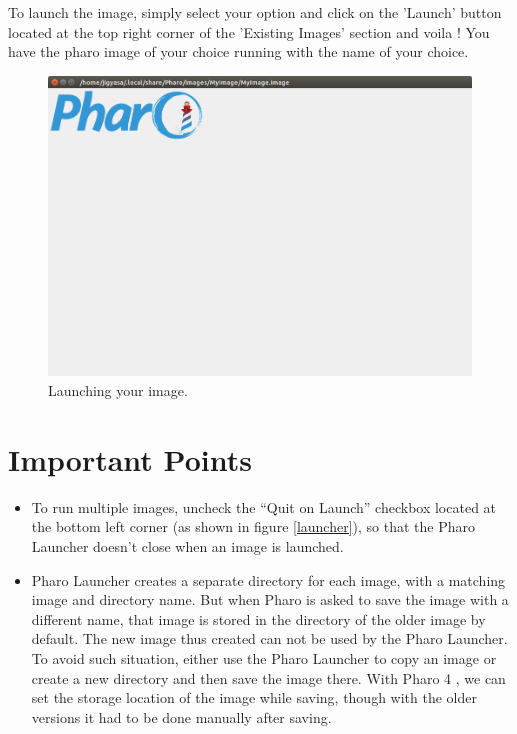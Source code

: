 \documentclass[a4paper,10pt,twoside]{book}
\begin{document}
To launch the image, simply select your option and click on the 'Launch' button located at the top right corner of the 'Existing Images' section and voila ! You have the pharo image of your choice running with the name of your choice.


\begin{figure}

\begin{center}
\includegraphics[width=1.0\textwidth]{figures/myimg.png}\caption{Launching your image.\label{launchPL}}\end{center}
\end{figure}

\section{ Important Points}
\begin{itemize}
\item  To run multiple images, uncheck the “Quit on Launch” checkbox located at the bottom left corner (as shown in figure \ref{launcher}), so that the Pharo Launcher doesn't close when an image is launched.
\end{itemize}

\begin{itemize}
\item  Pharo Launcher creates a separate directory for each image, with a matching image and directory name. But when Pharo is asked to save the image with a different name, that image is stored in the directory of the older image by default. The new image thus created can not be used by the Pharo Launcher. To avoid such situation, either use the Pharo Launcher to copy an image or create a new directory and then save the image there. With Pharo 4 , we can set the storage location of the image while saving, though with the older versions it had to be done manually after saving.
\end{itemize}
\end{document}
